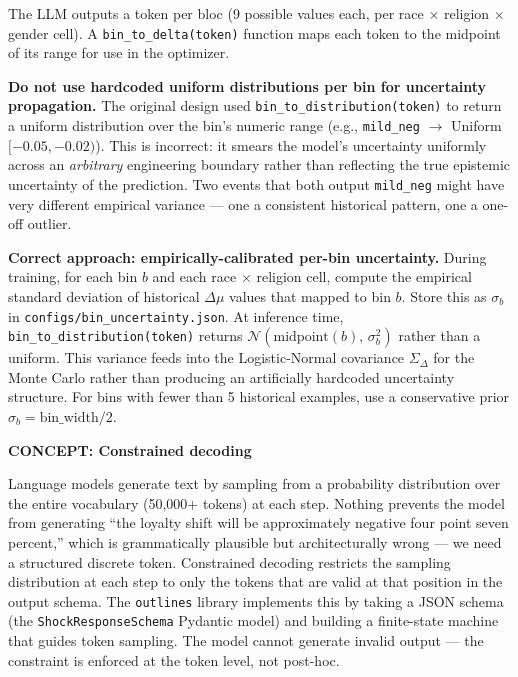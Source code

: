 \documentclass[11pt]{article}
\newcommand{\concept}[2]{%
  \begin{mdframed}[style=conceptbox]
  {\small\bfseries\color{bluefg}CONCEPT: #1}\par\smallskip #2
  \end{mdframed}}
\begin{document}
The LLM outputs a token per bloc (9 possible values each, per race $\times$ religion
$\times$ gender cell). A \texttt{bin\_to\_delta(token)} function maps each token to
the midpoint of its range for use in the optimizer.

\begin{mdframed}[style=warnbox]
\textbf{Do not use hardcoded uniform distributions per bin for uncertainty propagation.}
The original design used \texttt{bin\_to\_distribution(token)} to return a uniform
distribution over the bin's numeric range (e.g., \texttt{mild\_neg} $\to$
Uniform$[-0.05, -0.02)$). This is incorrect: it smears the model's uncertainty
uniformly across an \emph{arbitrary} engineering boundary rather than reflecting
the true epistemic uncertainty of the prediction. Two events that both output
\texttt{mild\_neg} might have very different empirical variance --- one a
consistent historical pattern, one a one-off outlier.

\textbf{Correct approach: empirically-calibrated per-bin uncertainty.}
During training, for each bin $b$ and each race $\times$ religion cell, compute the
empirical standard deviation of historical $\Delta\mu$ values that mapped to bin $b$.
Store this as $\sigma_b$ in \texttt{configs/bin\_uncertainty.json}. At inference time,
\texttt{bin\_to\_distribution(token)} returns
$\mathcal{N}(\text{midpoint}(b),\, \sigma_b^2)$ rather than a uniform.
This variance feeds into the Logistic-Normal covariance $\Sigma_\Delta$ for the
Monte Carlo rather than producing an artificially hardcoded uncertainty structure.
For bins with fewer than 5 historical examples, use a conservative prior
$\sigma_b = \text{bin\_width}/2$.
\end{mdframed}

\concept{Constrained decoding}{
Language models generate text by sampling from a probability distribution over the
entire vocabulary (50,000+ tokens) at each step. Nothing prevents the model from
generating ``the loyalty shift will be approximately negative four point seven
percent,'' which is grammatically plausible but architecturally wrong --- we need
a structured discrete token. Constrained decoding restricts the sampling distribution
at each step to only the tokens that are valid at that position in the output schema.
The \texttt{outlines} library implements this by taking a JSON schema (the
\texttt{ShockResponseSchema} Pydantic model) and building a finite-state machine
that guides token sampling. The model cannot generate invalid output --- the
constraint is enforced at the token level, not post-hoc.
}
\end{document}
